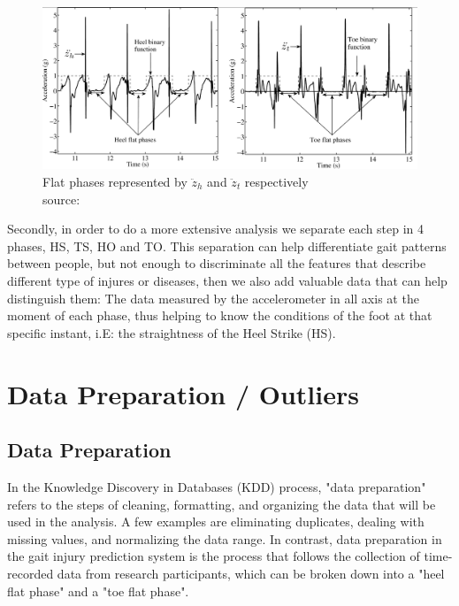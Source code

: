 \begin{figure}[h]
    \centering
    \includegraphics[scale=0.2]{Images/flat-phases.png}
    \captionsetup{justification=centering}
    \caption{Flat phases represented by $\ddot{z}_h$ and $\ddot{z}_t$ respectively \\ source: \cite{Mohamed2015}}
    \label{fig:flat-phases}
\end{figure}

\bigskip

Secondly, in order to do a more extensive analysis we separate each step in 4 phases, HS, TS, HO and TO. This separation can help differentiate gait patterns between people, but not enough to discriminate all the features that describe different type of injures or diseases, then we also add valuable data that can help distinguish them: The data measured by the accelerometer in all axis at the moment of each phase, thus helping to know the conditions of the foot at that specific instant, i.E: the straightness of the Heel Strike (HS). 




\section{Data Preparation / Outliers}

\bigskip
\subsection{Data Preparation}
\label{subsection:Data Preparation}
In the Knowledge Discovery in Databases (KDD) process, "data preparation" refers to the steps of cleaning, formatting, and organizing the data that will be used in the analysis. A few examples are eliminating duplicates, dealing with missing values, and normalizing the data range. In contrast, data preparation in the gait injury prediction system is the process that follows the collection of time-recorded data from research participants, which can be broken down into a "heel flat phase" and a "toe flat phase".

